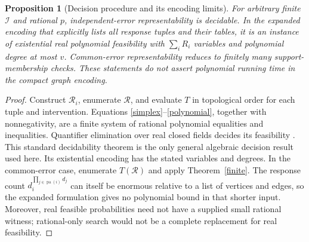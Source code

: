 \documentclass[11pt]{article}
\newtheorem{proposition}[theorem]{Proposition}
\theoremstyle{remark}
\begin{document}
\begin{proposition}[Decision procedure and its encoding limits]
For arbitrary finite $\mathcal I$ and rational $p$, independent-error representability is decidable. In the expanded encoding that explicitly lists all response tuples and their tables, it is an instance of existential real polynomial feasibility with $\sum_iR_i$ variables and polynomial degree at most $v$. Common-error representability reduces to finitely many support-membership checks. These statements do not assert polynomial running time in the compact graph encoding.
\end{proposition}
\begin{proof}
Construct $\mathcal R_i$, enumerate $\mathcal R$, and evaluate $T$ in topological order for each tuple and intervention. Equations \eqref{simplex}--\eqref{polynomial}, together with nonnegativity, are a finite system of rational polynomial equalities and inequalities. Quantifier elimination over real closed fields decides its feasibility \cite[Chapters 13--14]{bpr}. This standard decidability theorem is the only general algebraic decision result used here. Its existential encoding has the stated variables and degrees. In the common-error case, enumerate $T(\mathcal R)$ and apply Theorem~\ref{finite}. The response count $d_i^{\prod_{j\in\operatorname{pa}(i)}d_j}$ can itself be enormous relative to a list of vertices and edges, so the expanded formulation gives no polynomial bound in that shorter input. Moreover, real feasible probabilities need not have a supplied small rational witness; rational-only search would not be a complete replacement for real feasibility.
\end{proof}
\end{document}
